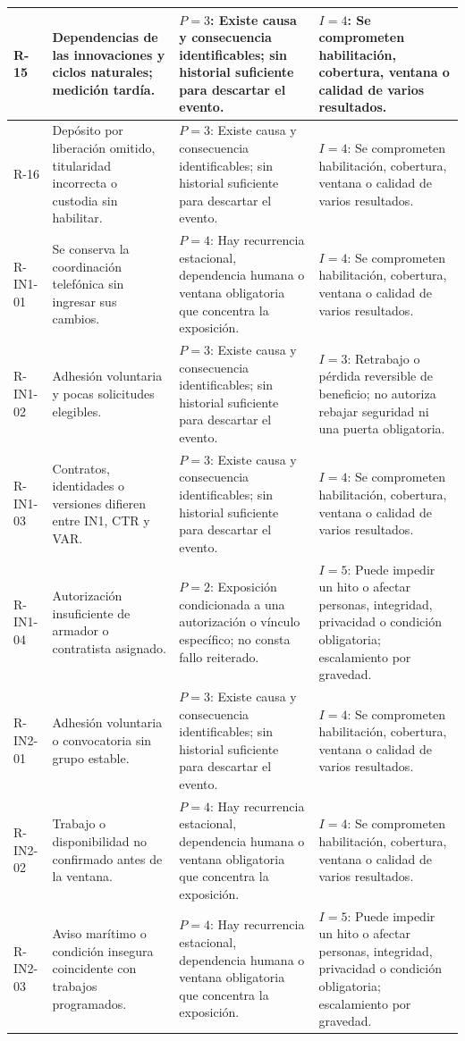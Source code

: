 \begin{longtable}{L{.10\textwidth}L{.27\textwidth}L{.27\textwidth}L{.27\textwidth}}
R-15 & Dependencias de las innovaciones y ciclos naturales; medición tardía. & $P=3$: Existe causa y consecuencia identificables; sin historial suficiente para descartar el evento. & $I=4$: Se comprometen habilitación, cobertura, ventana o calidad de varios resultados.\\\hline
R-16 & Depósito por liberación omitido, titularidad incorrecta o custodia sin habilitar. & $P=3$: Existe causa y consecuencia identificables; sin historial suficiente para descartar el evento. & $I=4$: Se comprometen habilitación, cobertura, ventana o calidad de varios resultados.\\\hline
R-IN1-01 & Se conserva la coordinación telefónica sin ingresar sus cambios. & $P=4$: Hay recurrencia estacional, dependencia humana o ventana obligatoria que concentra la exposición. & $I=4$: Se comprometen habilitación, cobertura, ventana o calidad de varios resultados.\\\hline
R-IN1-02 & Adhesión voluntaria y pocas solicitudes elegibles. & $P=3$: Existe causa y consecuencia identificables; sin historial suficiente para descartar el evento. & $I=3$: Retrabajo o pérdida reversible de beneficio; no autoriza rebajar seguridad ni una puerta obligatoria.\\\hline
R-IN1-03 & Contratos, identidades o versiones difieren entre IN1, CTR y VAR. & $P=3$: Existe causa y consecuencia identificables; sin historial suficiente para descartar el evento. & $I=4$: Se comprometen habilitación, cobertura, ventana o calidad de varios resultados.\\\hline
R-IN1-04 & Autorización insuficiente de armador o contratista asignado. & $P=2$: Exposición condicionada a una autorización o vínculo específico; no consta fallo reiterado. & $I=5$: Puede impedir un hito o afectar personas, integridad, privacidad o condición obligatoria; escalamiento por gravedad.\\\hline
R-IN2-01 & Adhesión voluntaria o convocatoria sin grupo estable. & $P=3$: Existe causa y consecuencia identificables; sin historial suficiente para descartar el evento. & $I=4$: Se comprometen habilitación, cobertura, ventana o calidad de varios resultados.\\\hline
R-IN2-02 & Trabajo o disponibilidad no confirmado antes de la ventana. & $P=4$: Hay recurrencia estacional, dependencia humana o ventana obligatoria que concentra la exposición. & $I=4$: Se comprometen habilitación, cobertura, ventana o calidad de varios resultados.\\\hline
R-IN2-03 & Aviso marítimo o condición insegura coincidente con trabajos programados. & $P=4$: Hay recurrencia estacional, dependencia humana o ventana obligatoria que concentra la exposición. & $I=5$: Puede impedir un hito o afectar personas, integridad, privacidad o condición obligatoria; escalamiento por gravedad.\\\hline

\end{longtable}
